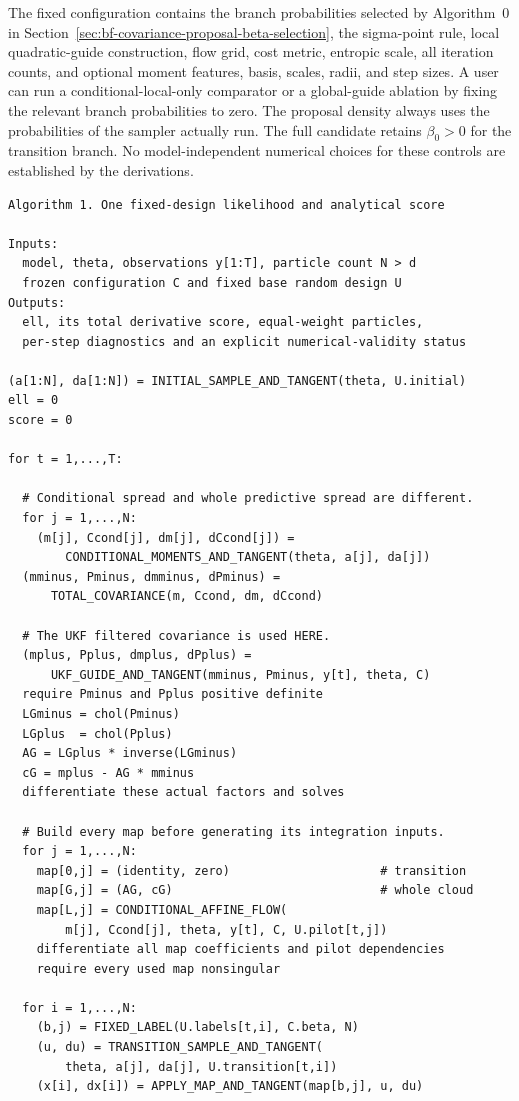 The fixed configuration contains the branch probabilities selected by
Algorithm~0 in Section~\ref{sec:bf-covariance-proposal-beta-selection}, the sigma-point rule,
local quadratic-guide construction, flow grid, cost metric, entropic scale,
all iteration counts, and optional moment features, basis, scales, radii,
and step sizes. A user can run a conditional-local-only comparator or a
global-guide ablation by fixing the relevant branch probabilities to zero.
The proposal density always uses the probabilities of the sampler actually
run. The full candidate retains \(\beta_0>0\) for the transition branch.
No model-independent numerical choices for these controls are established
by the derivations.

\begin{lstlisting}
Algorithm 1. One fixed-design likelihood and analytical score

Inputs:
  model, theta, observations y[1:T], particle count N > d
  frozen configuration C and fixed base random design U
Outputs:
  ell, its total derivative score, equal-weight particles,
  per-step diagnostics and an explicit numerical-validity status

(a[1:N], da[1:N]) = INITIAL_SAMPLE_AND_TANGENT(theta, U.initial)
ell = 0
score = 0

for t = 1,...,T:

  # Conditional spread and whole predictive spread are different.
  for j = 1,...,N:
    (m[j], Ccond[j], dm[j], dCcond[j]) =
        CONDITIONAL_MOMENTS_AND_TANGENT(theta, a[j], da[j])
  (mminus, Pminus, dmminus, dPminus) =
      TOTAL_COVARIANCE(m, Ccond, dm, dCcond)

  # The UKF filtered covariance is used HERE.
  (mplus, Pplus, dmplus, dPplus) =
      UKF_GUIDE_AND_TANGENT(mminus, Pminus, y[t], theta, C)
  require Pminus and Pplus positive definite
  LGminus = chol(Pminus)
  LGplus  = chol(Pplus)
  AG = LGplus * inverse(LGminus)
  cG = mplus - AG * mminus
  differentiate these actual factors and solves

  # Build every map before generating its integration inputs.
  for j = 1,...,N:
    map[0,j] = (identity, zero)                     # transition
    map[G,j] = (AG, cG)                             # whole cloud
    map[L,j] = CONDITIONAL_AFFINE_FLOW(
        m[j], Ccond[j], theta, y[t], C, U.pilot[t,j])
    differentiate all map coefficients and pilot dependencies
    require every used map nonsingular

  for i = 1,...,N:
    (b,j) = FIXED_LABEL(U.labels[t,i], C.beta, N)
    (u, du) = TRANSITION_SAMPLE_AND_TANGENT(
        theta, a[j], da[j], U.transition[t,i])
    (x[i], dx[i]) = APPLY_MAP_AND_TANGENT(map[b,j], u, du)


\end{lstlisting}
